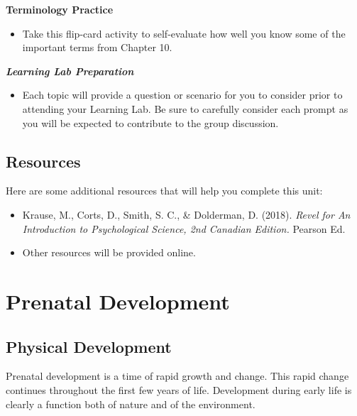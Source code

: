 \documentclass[
]{book}
\providecommand{\tightlist}{%
  \setlength{\itemsep}{0pt}\setlength{\parskip}{0pt}}
\begin{document}
\textbf{Terminology Practice}

\begin{itemize}
\tightlist
\item
  Take this flip-card activity to self-evaluate how well you know some of the important terms from Chapter 10.
\end{itemize}

\textbf{\emph{Learning Lab Preparation}}

\begin{itemize}
\tightlist
\item
  Each topic will provide a question or scenario for you to consider prior to attending your Learning Lab. Be sure to carefully consider each prompt as you will be expected to contribute to the group discussion.
\end{itemize}

\hypertarget{resources-4}{%
\subsection*{Resources}\label{resources-4}}

Here are some additional resources that will help you complete this unit:

\begin{itemize}
\tightlist
\item
  Krause, M., Corts, D., Smith, S. C., \& Dolderman, D. (2018). \emph{Revel for An Introduction to Psychological Science, 2nd Canadian Edition.} Pearson Ed.\\
\item
  Other resources will be provided online.
\end{itemize}

\hypertarget{prenatal-development}{%
\section{Prenatal Development}\label{prenatal-development}}

\hypertarget{physical-development}{%
\subsection*{Physical Development}\label{physical-development}}

Prenatal development is a time of rapid growth and change. This rapid change continues throughout the first few years of life. Development during early life is clearly a function both of nature and of the environment.
\end{document}
